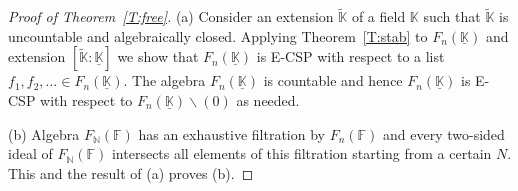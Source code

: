 \documentclass{amsart} \textwidth=18.0cm \oddsidemargin=-1cm \evensidemargin=-1cm \topmargin=-1cm \textheight=23cm
\theoremstyle{definition}
\begin{document}
\begin{proof}[Proof of Theorem~\ref{T:free}] 
(a) Consider an extension $\widetilde{\mathbb K}$ of a field $\mathbb K$ such that $\widetilde{\mathbb K}$ is uncountable and algebraically closed. 
Applying Theorem~\ref{T:stab} to $F_n(\underline{\mathbb K})$ and extension $[\widetilde{\mathbb K}:\underline{\mathbb K}]$ we show that $F_n(\underline{\mathbb K})$ is E-CSP with respect to a list $f_1, f_2,\ldots\in F_n(\underline{\mathbb K})$. 
The algebra $F_n(\underline{\mathbb K})$ is countable and hence $F_n(\underline{\mathbb K})$ is E-CSP with respect to $F_n(\underline{\mathbb K})\backslash(0)$ as needed. 

(b) Algebra $F_{\mathbb N}(\mathbb F)$ has an exhaustive filtration by $F_n(\mathbb F)$ and every two-sided ideal of $F_{\mathbb N}(\mathbb F)$ intersects all elements of this filtration starting from a certain $N$. 
This and the result of (a) proves (b).

\end{proof}
\end{document}
